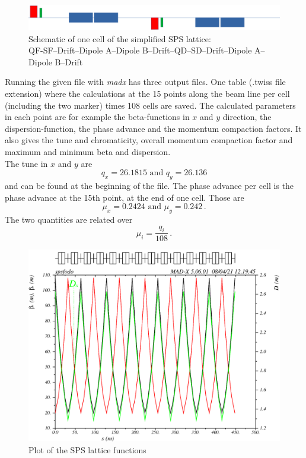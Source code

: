 \begin{figure}[tbp]
    \centering
    \includegraphics[width=\linewidth]{../../part2/cellSPS.png}
    \caption{Schematic of one cell of the simplified SPS lattice:\\QF-SF–Drift–Dipole A–Dipole B–Drift–QD–SD–Drift–Dipole A–Dipole B–Drift}
    \label{fig:lattice}
\end{figure}

Running the given file with \textit{madx} has three output files. One table (.twiss file extension) where the calculations at the 15 points along the beam line per cell (including the two marker) times 108 cells are saved. The calculated parameters in each point are for example the beta-functions in $x$ and $y$ direction, the dispersion-function, the phase advance and the momentum compaction factors. It also gives the tune and chromaticity, overall momentum compaction factor and maximum and minimum beta and dispersion.\\
The tune in $x$ and $y$ are 
$$q_x=26.1815\text{ and }q_y=26.136$$
and can be found at the beginning of the file. The phase advance per cell is the phase advance at the 15th point, at the end of one cell. Those are $$\mu_x=0.2424\text{ and }\mu_y=0.242\,.$$ The two quantities are related over $$\mu_i=\frac{q_i}{108}\,.$$
\begin{figure}[tbp]
    \centering
    \includegraphics[width=0.8\linewidth]{../../part2/sps_plot.png}
    \caption{Plot of the SPS lattice functions}
    \label{fig:sps_orig}
\end{figure}
\par
